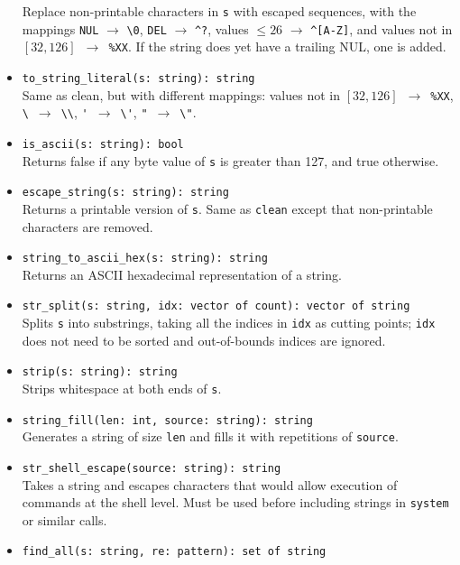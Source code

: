 \documentclass[10pt,landscape]{article}
\begin{document}
\begin{multicols*}{2}
\begin{itemize}
    Replace non-printable characters in \texttt{s} with escaped sequences,
    with the mappings
    \verb|NUL| $\rightarrow$ \verb|\0|,
    \verb|DEL| $\rightarrow$ \verb|^?|,
    values $\le 26$ $\rightarrow$ \verb|^[A-Z]|,
    and values not in $[32, 126]$~$\rightarrow$~\verb|%XX|. If the string does
    yet have a trailing NUL, one is added.
  \item \verb|to_string_literal(s: string): string|\\
    Same as clean, but with different mappings:
    values not in $[32, 126]$~$\rightarrow$~\verb|%XX|,
    \verb|\|~$\rightarrow$~\verb|\\|,
    \verb|'|~$\rightarrow$~\verb|\'|,
    \verb|"|~$\rightarrow$~\verb|\"|.
  \item \verb|is_ascii(s: string): bool|\\
    Returns false if any byte value of \texttt{s} is greater than 127, and true
    otherwise.
  \item \verb|escape_string(s: string): string|\\
    Returns a printable version of \texttt{s}. Same as \texttt{clean} except
    that non-printable characters are removed.
  \item \verb|string_to_ascii_hex(s: string): string|\\
    Returns an ASCII hexadecimal representation of a string.
  \item \verb|str_split(s: string, idx: vector of count): vector of string|\\
    Splits \texttt{s} into substrings, taking all the indices in
    \texttt{idx} as cutting points; \texttt{idx} does not need to be sorted and
    out-of-bounds indices are ignored.
  \item \verb|strip(s: string): string|\\
    Strips whitespace at both ends of \texttt{s}.
  \item \verb|string_fill(len: int, source: string): string|\\
    Generates a string of size \texttt{len} and fills it with repetitions of
    \texttt{source}.
  \item \verb|str_shell_escape(source: string): string|\\
    Takes a string and escapes characters that would allow execution of
    commands at the shell level. Must be used before including strings in
    \verb|system| or similar calls.
  \item \verb|find_all(s: string, re: pattern): set of string|\\

\end{itemize}
\end{multicols*}
\end{document}
